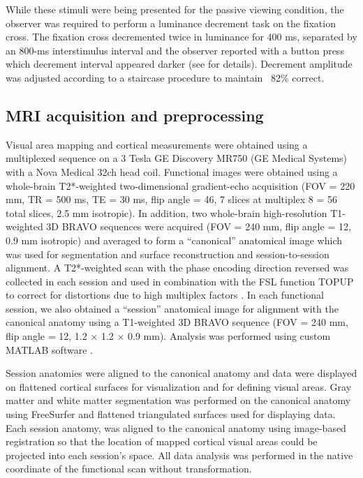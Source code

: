 While these stimuli were being presented for the passive viewing condition, the observer was required to perform a luminance decrement task on the fixation cross. The fixation cross decremented twice in luminance for 400 ms, separated by an 800-ms interstimulus interval and the observer reported with a button press which decrement interval appeared darker (see \citet{Gardner2008-yx} for details). Decrement amplitude was adjusted according to a staircase procedure to maintain ~82\% correct.

\noindent
\subsection{MRI acquisition and preprocessing}

Visual area mapping and cortical measurements were obtained using a multiplexed sequence on a 3 Tesla GE Discovery MR750 (GE Medical Systems) with a Nova Medical 32ch head coil. Functional images were obtained using a whole-brain T2*-weighted two-dimensional gradient-echo acquisition (FOV = 220 mm, TR = 500 ms, TE = 30 ms, flip angle = 46\degree, 7 slices at multiplex 8 = 56 total slices, 2.5 mm isotropic). In addition, two whole-brain high-resolution T1-weighted 3D BRAVO sequences were acquired (FOV = 240 mm, flip angle = 12\degree, 0.9 mm isotropic) and averaged to form a “canonical” anatomical image which was used for segmentation and surface reconstruction and session-to-session alignment. A T2*-weighted scan with the phase encoding direction reversed was collected in each session and used in combination with the FSL function TOPUP to correct for distortions due to high multiplex factors \citep{Andersson2003-yb}. In each functional session, we also obtained a “session” anatomical image for alignment with the canonical anatomy using a T1-weighted 3D BRAVO sequence (FOV = 240 mm, flip angle = 12\degree, 1.2 $\times$ 1.2 $\times$ 0.9 mm). Analysis was performed using custom MATLAB software \citep{Gardner2018-hf}.

Session anatomies were aligned to the canonical anatomy and data were displayed on flattened cortical surfaces for visualization and for defining visual areas. Gray matter and white matter segmentation was performed on the canonical anatomy using FreeSurfer \citep{Dale1999-oq} and flattened triangulated surfaces used for displaying data. Each session anatomy, was aligned to the canonical anatomy using image-based registration \citep{Nestares2000-by} so that the location of mapped cortical visual areas could be projected into each session’s space. All data analysis was performed in the native coordinate of the functional scan without transformation.

